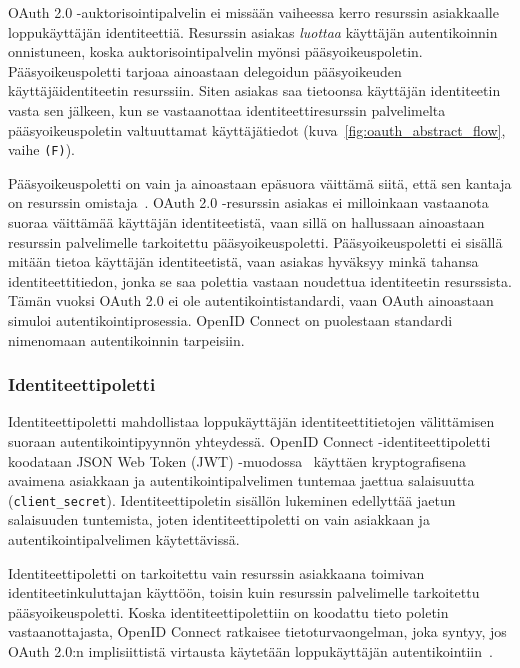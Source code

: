 \documentclass[finnish,gradu]{tktltiki}
\begin{document}
  OAuth 2.0 -auktorisointipalvelin ei missään vaiheessa kerro resurssin asiakkaalle loppukäyttäjän identiteettiä. Resurssin asiakas \emph{luottaa} käyttäjän autentikoinnin onnistuneen, koska auktorisointipalvelin myönsi pääsyoikeuspoletin. Pääsyoikeuspoletti tarjoaa ainoastaan delegoidun pääsyoikeuden käyttäjäidentiteetin resurssiin. Siten asiakas saa tietoonsa käyttäjän identiteetin vasta sen jälkeen, kun se vastaanottaa identiteettiresurssin palvelimelta pääsyoikeuspoletin valtuuttamat käyttäjätiedot (kuva~\ref{fig:oauth_abstract_flow}, vaihe \verb!(F)!).

  Pääsyoikeuspoletti on vain ja ainoastaan epäsuora väittämä siitä, että sen kantaja on resurssin omistaja~\cite{bradley_oauth_authentication_problem_2012}. OAuth 2.0 -resurssin asiakas ei milloinkaan vastaanota suoraa väittämää käyttäjän identiteetistä, vaan sillä on hallussaan ainoastaan resurssin palvelimelle tarkoitettu pääsyoikeuspoletti. Pääsyoikeuspoletti ei sisällä mitään tietoa käyttäjän identiteetistä, vaan asiakas hyväksyy minkä tahansa identiteettitiedon, jonka se saa polettia vastaan noudettua identiteetin resurssista. Tämän vuoksi OAuth 2.0 ei ole autentikointistandardi, vaan OAuth ainoastaan simuloi autentikointiprosessia. OpenID Connect on puolestaan standardi nimenomaan autentikoinnin tarpeisiin.


  \subsubsection{Identiteettipoletti} %
  \label{ssub:identiteettipoletti}

  Identiteettipoletti mahdollistaa loppukäyttäjän identiteettitietojen välittämisen suoraan autentikointipyynnön yhteydessä. OpenID Connect -identiteettipoletti koodataan JSON Web Token (JWT) -muodossa~\cite{json_web_token_2011} käyttäen kryptografisena avaimena asiakkaan ja autentikointipalvelimen tuntemaa jaettua salaisuutta (\verb!client_secret!). Identiteettipoletin sisällön lukeminen edellyttää jaetun salaisuuden tuntemista, joten identiteettipoletti on vain asiakkaan ja autentikointipalvelimen käytettävissä.

  Identiteettipoletti on tarkoitettu vain resurssin asiakkaana toimivan identiteetinkuluttajan käyttöön, toisin kuin resurssin palvelimelle tarkoitettu pääsyoikeuspoletti. Koska identiteettipolettiin on koodattu tieto poletin vastaanottajasta, OpenID Connect ratkaisee tietoturvaongelman, joka syntyy, jos OAuth 2.0:n implisiittistä virtausta käytetään loppukäyttäjän autentikointiin~\cite{bradley_oauth_authentication_problem_2012}.
\end{document}
